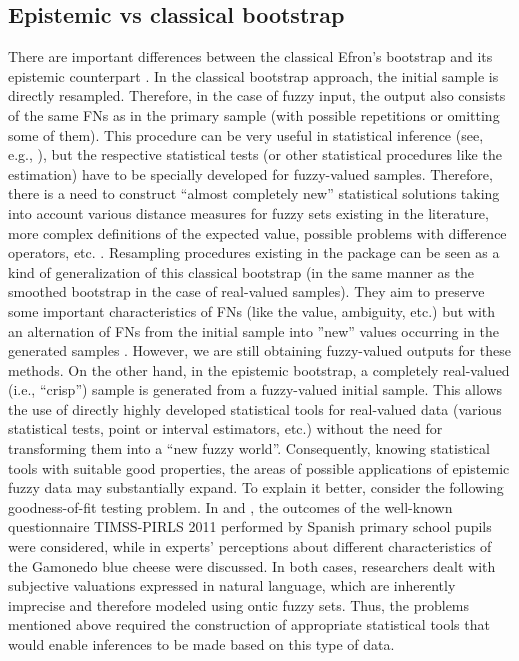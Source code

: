 \subsection{Epistemic vs classical bootstrap}
There are important differences between the classical Efron's bootstrap \citep{EfroTibs93} and its epistemic counterpart \citep{grzegorzewski2021,pgmr2022,PGMR2024AMS}.
In the classical bootstrap approach, the initial sample is directly resampled.
Therefore, in the case of fuzzy input, the output also consists of the same FNs as in the primary sample (with possible repetitions or omitting some of them).
This procedure can be very useful in statistical inference (see, e.g., \citep{gil,LUBIANO2016918,Montenegro2004}), but the respective statistical tests (or other statistical procedures like the estimation) have to be specially developed for fuzzy-valued samples.
Therefore, there is a need to construct ``almost completely new'' statistical solutions taking into account various distance measures for fuzzy sets existing in the literature, more complex definitions of the expected value, possible problems with difference operators, etc. \citep{ban_coroianu_pg,HEILPERN199281}.
Resampling procedures existing in the  package can be seen as a kind of generalization of this classical bootstrap (in the same manner as the smoothed bootstrap in the case of real-valued samples).
They aim to preserve some important characteristics of FNs (like the value, ambiguity, etc.) but with an alternation of FNs from the initial sample into ''new'' values occurring in the generated samples \citep{grzegorzewski_amcs2020,GrzegorzewskiRom2021}.
However, we are still obtaining fuzzy-valued outputs for these methods.
On the other hand, in the epistemic bootstrap, a completely real-valued (i.e., ``crisp'') sample is generated from a fuzzy-valued initial sample.
This allows the use of directly highly developed statistical tools for real-valued data (various statistical tests, point or interval estimators, etc.) without the need for transforming them into a ``new fuzzy world''. 
Consequently, knowing statistical tools with suitable good properties, the areas of possible applications of epistemic fuzzy data may substantially expand.
To explain it better, consider the following goodness-of-fit testing problem. In \cite{LUBIANO2016918} and \cite{lubiano2017}, the outcomes of the well-known questionnaire TIMSS-PIRLS 2011 performed by Spanish primary school pupils were considered, while in  \cite{Ramos-Guajardo2019} experts' perceptions about different characteristics of the Gamonedo blue cheese were discussed. In both cases, researchers dealt with subjective valuations expressed in natural language, which are inherently imprecise and therefore modeled using ontic fuzzy sets. Thus, the problems mentioned above required the construction of appropriate statistical tools that would enable inferences to be made based on this type of data.
